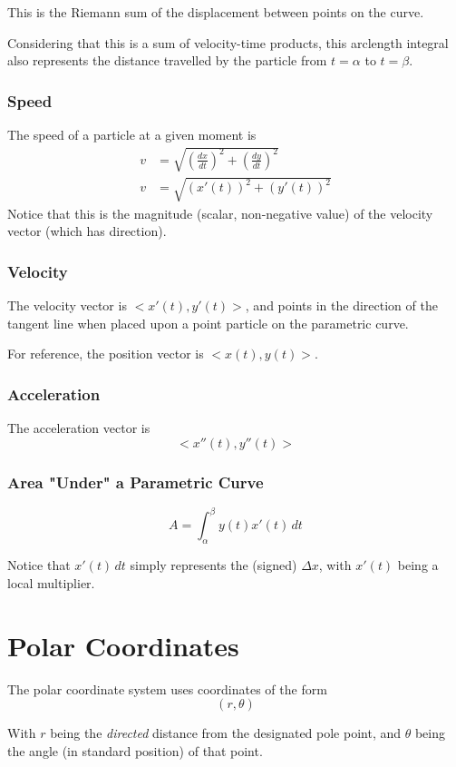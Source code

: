 \documentclass{article}
\begin{document}
This is the Riemann sum of the displacement between points on the curve.

Considering that this is a sum of velocity-time products, this arclength integral also represents the distance travelled by the particle from $t=\alpha$ to $t=\beta$.

\subsubsection{Speed}
The speed of a particle at a given moment is
\begin{align*}
    v &= \sqrt{\left(\frac{dx}{dt}\right)^2 + \left(\frac{dy}{dt}\right)^2} \\
    v &= \sqrt{(x'(t))^2 + (y'(t))^2}
\end{align*}
Notice that this is the magnitude (scalar, non-negative value) of the velocity vector (which has direction).

\subsubsection{Velocity}
The velocity vector is $<x'(t), y'(t)>$, and points in the direction of the tangent line when placed upon a point particle on the parametric curve.

For reference, the position vector is $<x(t), y(t)>$.

\subsubsection{Acceleration}
The acceleration vector is
$$<x''(t), y''(t)>$$

\subsubsection{Area "Under" a Parametric Curve}
$$A = \int_{\alpha}^{\beta} y(t) x'(t) \,dt$$

Notice that $x'(t) \,dt$ simply represents the (signed) $\Delta x$, with $x'(t)$ being a local multiplier.

\section{Polar Coordinates}
The polar coordinate system uses coordinates of the form
$$(r, \theta)$$

With $r$ being the \emph{directed} distance from the designated pole point, and $\theta$ being the angle (in standard position) of that point.
\end{document}
